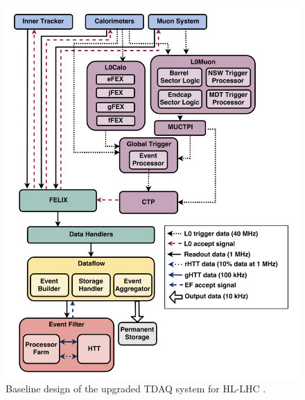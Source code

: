 \begin{figure}[htbp]
  \centering
  \includegraphics[width=1.0\textwidth]{figs/chapter2/TDAQ_baseline.png}
  \caption{Baseline design of the upgraded TDAQ system for HL-LHC \cite{TDAQ_TDR}.}
  \label{fig:TDAQ_baseline}
\end{figure}

